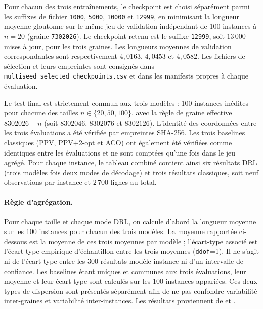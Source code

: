 \documentclass[12pt, a4paper, twoside, openright]{book}
\begin{document}
Pour chacun des trois entraînements, le checkpoint est choisi séparément
parmi les suffixes de fichier \texttt{1000}, \texttt{5000}, \texttt{10000}
et \texttt{12999}, en minimisant la longueur moyenne gloutonne sur le même
jeu de validation indépendant de 100 instances à $n=20$ (graine
\texttt{7302026}). Le checkpoint retenu est le suffixe \texttt{12999}, soit
$13\,000$ mises à jour, pour les trois graines. Les longueurs moyennes de
validation correspondantes sont respectivement $4{,}0163$, $4{,}0453$ et
$4{,}0582$. Les fichiers de sélection et leurs empreintes sont consignés dans
\texttt{multiseed\_selected\_checkpoints.csv} et dans les manifests propres
à chaque évaluation.

Le test final est strictement commun aux trois modèles : 100 instances
inédites pour chacune des tailles $n\in\{20,50,100\}$, avec la règle de
graine effective $8302026+n$ (soit $8302046$, $8302076$ et $8302126$).
L'identité des coordonnées entre les trois évaluations a été vérifiée par
empreintes SHA-256. Les trois baselines classiques (PPV, PPV+2-opt et ACO)
ont également été vérifiées comme identiques entre les évaluations et ne sont
comptées qu'une fois dans le jeu agrégé. Pour chaque instance, le tableau
combiné contient ainsi six résultats DRL (trois modèles fois deux modes de
décodage) et trois résultats classiques, soit neuf observations par instance
et $2\,700$ lignes au total.

\paragraph{Règle d'agrégation.}
Pour chaque taille et chaque mode DRL, on calcule d'abord la longueur moyenne
sur les 100 instances pour chacun des trois modèles. La moyenne rapportée
ci-dessous est la moyenne de ces trois moyennes par modèle ; l'écart-type
associé est l'écart-type empirique d'échantillon entre les trois moyennes
(\texttt{ddof}=1). Il ne s'agit ni de l'écart-type entre les 300 résultats
modèle-instance ni d'un intervalle de confiance. Les baselines étant uniques
et communes aux trois évaluations, leur moyenne et leur écart-type sont
calculés sur les 100 instances appariées. Ces deux types de dispersion sont
présentés séparément afin de ne pas confondre variabilité inter-graines et
variabilité inter-instances. Les résultats proviennent de
 et
.
\end{document}
